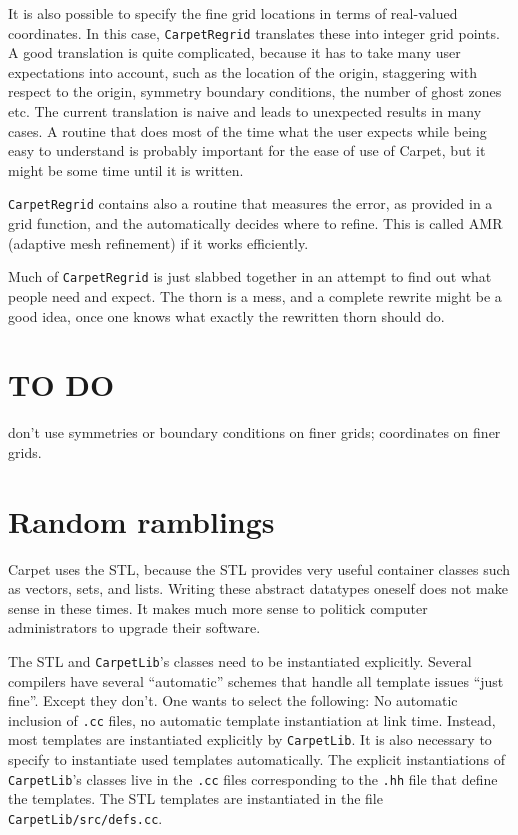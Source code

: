 \documentclass{article}
\begin{document}
   It is also possible to specify the fine grid locations in terms of
   real-valued coordinates.  In this case, \texttt{CarpetRegrid}
   translates these into integer grid points.  A good translation is
   quite complicated, because it has to take many user expectations
   into account, such as the location of the origin, staggering with
   respect to the origin, symmetry boundary conditions, the number of
   ghost zones etc.  The current translation is naive and leads to
   unexpected results in many cases.  A routine that does most of the
   time what the user expects while being easy to understand is
   probably important for the ease of use of Carpet, but it might be
   some time until it is written.

   \texttt{CarpetRegrid} contains also a routine that measures the
   error, as provided in a grid function, and the automatically
   decides where to refine.  This is called AMR (adaptive mesh
   refinement) if it works efficiently.

   Much of \texttt{CarpetRegrid} is just slabbed together in an
   attempt to find out what people need and expect.  The thorn is a
   mess, and a complete rewrite might be a good idea, once one knows
   what exactly the rewritten thorn should do.



\section{TO DO}

   don't use symmetries or boundary conditions on finer grids;
   coordinates on finer grids.



\section{Random ramblings}

   Carpet uses the STL, because the STL provides very useful container
   classes such as vectors, sets, and lists.  Writing these abstract
   datatypes oneself does not make sense in these times.  It makes
   much more sense to politick computer administrators to upgrade
   their software.

   The STL and \texttt{CarpetLib}'s classes need to be instantiated
   explicitly.  Several compilers have several ``automatic'' schemes
   that handle all template issues ``just fine''.  Except they don't.
   One wants to select the following: No automatic inclusion of
   \texttt{.cc} files, no automatic template instantiation at link
   time.  Instead, most templates are instantiated explicitly by
   \texttt{CarpetLib}.  It is also necessary to specify to instantiate
   used templates automatically.  The explicit instantiations of
   \texttt{CarpetLib}'s classes live in the \texttt{.cc} files
   corresponding to the \texttt{.hh} file that define the templates.
   The STL templates are instantiated in the file
   \texttt{CarpetLib/src/defs.cc}.
\end{document}
